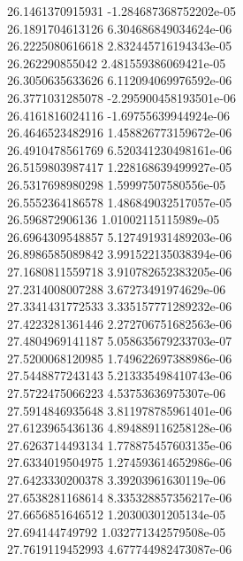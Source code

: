 {26.1461370915931 -1.284687368752202e-05 \\
26.1891704613126 6.304686849034624e-06 \\
26.2225080616618 2.832445716194343e-05 \\
26.262290855042 2.481559386069421e-05 \\
26.3050635633626 6.112094069976592e-06 \\
26.3771031285078 -2.295900458193501e-06 \\
26.4161816024116 -1.69755639944924e-06 \\
26.4646523482916 1.458826773159672e-06 \\
26.4910478561769 6.520341230498161e-06 \\
26.5159803987417 1.228168639499927e-05 \\
26.5317698980298 1.59997507580556e-05 \\
26.5552364186578 1.486849032517057e-05 \\
26.596872906136 1.01002115115989e-05 \\
26.6964309548857 5.127491931489203e-06 \\
26.8986585089842 3.991522135038394e-06 \\
27.1680811559718 3.910782652383205e-06 \\
27.2314008007288 3.67273491974629e-06 \\
27.3341431772533 3.335157771289232e-06 \\
27.4223281361446 2.272706751682563e-06 \\
27.4804969141187 5.058635679233703e-07 \\
27.5200068120985 1.749622697388986e-06 \\
27.5448877243143 5.213335498410743e-06 \\
27.5722475066223 4.53753636975307e-06 \\
27.5914846935648 3.811978785961401e-06 \\
27.6123965436136 4.894889116258128e-06 \\
27.6263714493134 1.778875457603135e-06 \\
27.6334019504975 1.274593614652986e-06 \\
27.6423330200378 3.39203961630119e-06 \\
27.6538281168614 8.335328857356217e-06 \\
27.6656851646512 1.20300301205134e-05 \\
27.694144749792 1.032771342579508e-05 \\
27.7619119452993 4.677744982473087e-06 \\
}
